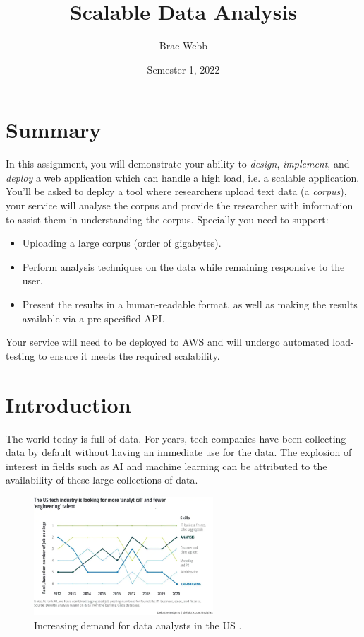 \documentclass{csse4400}
\title{Scalable Data Analysis}
\author{Brae Webb}
\date{Semester 1, 2022}
\begin{document}
\maketitle

\section*{Summary}
In this assignment, you will demonstrate your ability to \textsl{design},
\textsl{implement}, and \textsl{deploy} a web application which can handle a high load,
i.e. a scalable application.
You'll be asked to deploy a tool where researchers upload text data (a \textsl{corpus}),
your service will analyse the corpus and provide the researcher with information to assist them in understanding the corpus.
Specially you need to support:
\begin{itemize}
    \item Uploading a large corpus (order of gigabytes).
    \item Perform analysis techniques on the data while remaining responsive to the user.
    \item Present the results in a human-readable format, as well as making the results available via a pre-specified API.
\end{itemize}

Your service will need to be deployed to AWS and will undergo automated load-testing to ensure it meets the required scalability.

\section{Introduction}
The world today is full of data.
For years, tech companies have been collecting data by default without having an immediate use for the data.
The explosion of interest in fields such as AI and machine learning can be attributed to the availability of these large collections of data.

\begin{figure}[ht]
  \begin{center}
\includegraphics[width=0.6\textwidth]{analysis-demand}
  \end{center}\caption{Increasing demand for data analysts in the US \cite{data-analysis-shortage}.}
\end{figure}
\end{document}
